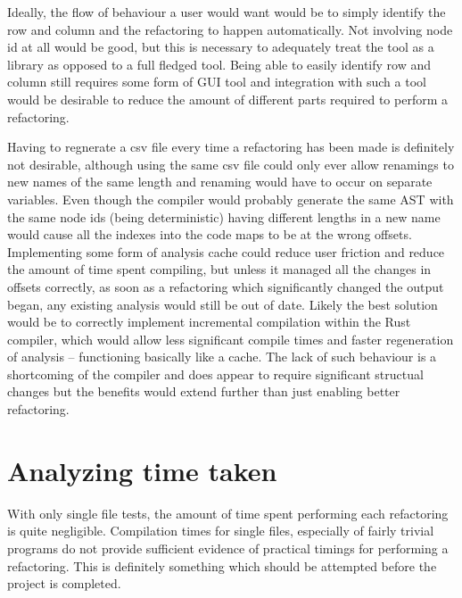 Ideally, the flow of behaviour a user would want would be to simply identify the row and column and the refactoring to happen automatically. Not involving node id at all would be good, but this is necessary to adequately treat the tool as a library as opposed to a full fledged tool. Being able to easily identify row and column still requires some form of GUI tool and integration with such a tool would be desirable to reduce the amount of different parts required to perform a refactoring. 

Having to regnerate a csv file every time a refactoring has been made is definitely not desirable, although using the same csv file could only ever allow renamings to new names of the same length and renaming would have to occur on separate variables. Even though the compiler would probably generate the same AST with the same node ids (being deterministic) having different lengths in a new name would cause all the indexes into the code maps to be at the wrong offsets. Implementing some form of analysis cache could reduce user friction and reduce the amount of time spent compiling, but unless it managed all the changes in offsets correctly, as soon as a refactoring which significantly changed the output began, any existing analysis would still be out of date. Likely the best solution would be to correctly implement incremental compilation within the Rust compiler, which would allow less significant compile times and faster regeneration of analysis -- functioning basically like a cache. The lack of such behaviour is a shortcoming of the compiler and does appear to require significant structual changes but the benefits would extend further than just enabling better refactoring.


\section{Analyzing time taken}
With only single file tests, the amount of time spent performing each refactoring is quite negligible. Compilation times for single files, especially of fairly trivial programs do not provide sufficient evidence of practical timings for performing a refactoring. This is definitely something which should be attempted before the project is completed.

